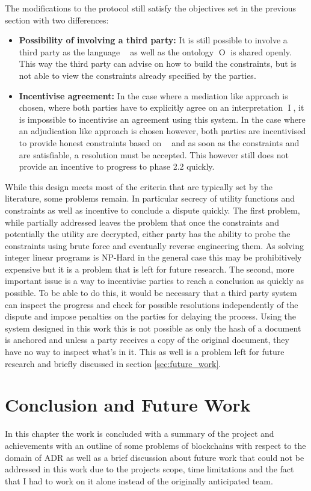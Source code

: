 \documentclass[12pt,msc,a4paper,oneside]{ucl_thesis}
\DeclareMathOperator{\Proplang}{\mathcal{L}(N)}
\DeclareMathOperator{\Interpretation}{I}
\DeclareMathOperator{\Ontology}{O}
\begin{document}
The modifications to the protocol still satisfy the objectives set in the previous section with two differences:
\begin{itemize}
    \item\textbf{Possibility of involving a third party:} It is still possible to involve a third party as the language $\Proplang$ as well as the ontology $\Ontology$ is shared openly. This way the third party can advise on how to build the constraints, but is not able to view the constraints already specified by the parties.

    \item\textbf{Incentivise agreement:} In the case where a mediation like approach is chosen, where both parties have to explicitly agree on an interpretation $\Interpretation$, it is impossible to incentivise an agreement using this system. In the case where an adjudication like approach is chosen however, both parties are incentivised to provide honest constraints based on $\Proplang$ and as soon as the constraints and are satisfiable, a resolution must be accepted. This however still does not provide an incentive to progress to phase 2.2 quickly. 
\end{itemize}
While this design meets most of the criteria that are typically set by the literature, some problems remain. In particular secrecy of utility functions and constraints as well as incentive to conclude a dispute quickly. The first problem, while partially addressed leaves the problem that once the constraints and potentially the utility are decrypted, either party has the ability to probe the constraints using brute force and eventually reverse engineering them. As solving integer linear programs is NP-Hard in the general case this may be prohibitively expensive but it is a problem that is left for future research. The second, more important issue is a way to incentivise parties to reach a conclusion as quickly as possible. To be able to do this, it would be necessary that a third party system can inspect the progress and check for possible resolutions independently of the dispute and impose penalties on the parties for delaying the process. Using the system designed in this work this is not possible as only the hash of a document is anchored and unless a party receives a copy of the original document, they have no way to inspect what's in it. This as well is a problem left for future research and briefly discussed in section \ref{sec:future_work}.

\chapter{Conclusion and Future Work}
In this chapter the work is concluded with a summary of the project and achievements with an outline of some problems of blockchains with respect to the domain of ADR as well as a brief discussion about future work that could not be addressed in this work due to the projects scope, time limitations and the fact that I had to work on it alone instead of the originally anticipated team.
\end{document}
